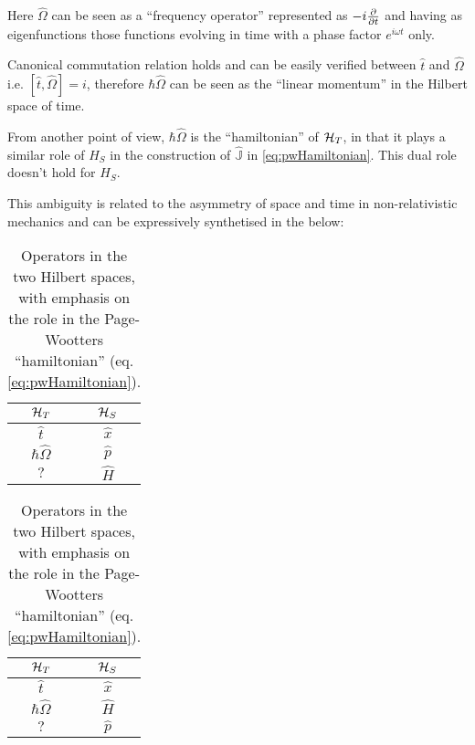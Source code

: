 Here $\hat{\Omega}$ can be seen as a ``frequency operator''
represented as $-i\pdv{t}$ and having as eigenfunctions
those functions evolving in time with a phase factor $e^{i \omega t}$ only.

Canonical commutation relation holds and can be easily verified
between $\hat{t}$ and $\hat{\Omega}$
i.e. $[\hat{t}, \hat{\Omega}] = i$,
therefore $\hbar\hat{\Omega}$ can be seen as the ``linear momentum''
in the Hilbert space of time.

From another point of view, $\hbar\hat{\Omega}$ is the ``hamiltonian'' of $\mathcal{H}_T$,
in that it plays a similar role of $H_S$ in the construction of
$\hat{\mathbb{J}}$ in \eqref{eq:pwHamiltonian}. This dual role doesn't hold
for $H_S$. 

This ambiguity is related to the asymmetry of space and time in non-relativistic
mechanics and can be expressively synthetised in the below:
{
  \begin{table}[h!]
    \parbox{.45\linewidth}{
      \centering
      \begin{tabular}{c|c}
        $\mathcal{H}_T$        & $\mathcal{H}_S$  \\
        \hline
        \hline
        $\hat{t}$           & $\hat{x}$     \\
        \hline
        $\hbar\hat{\Omega}$ & $\hat{p}$     \\
        \hline
        $?$                 & $\hat{H}$
      \end{tabular}
      {\caption{
        Operators in the two Hilbert spaces,
        with emphasis on the algebraic relation
        to other operators in the same space.
      }\label{op_comparison_alg}}
    }
    \hfill
    \parbox{.45\linewidth}{
      \centering
      \begin{tabular}{c|c}
        $\mathcal{H}_T$        & $\mathcal{H}_S$  \\
        \hline
        \hline
        $\hat{t}$           & $\hat{x}$     \\
        \hline
        $\hbar\hat{\Omega}$ & $\hat{H}$     \\
        \hline
        $?$                 & $\hat{p}$
      \end{tabular}
      {\caption{
        Operators in the two Hilbert spaces,
        with emphasis on the role in the
        Page-Wootters ``hamiltonian'' (eq. \ref{eq:pwHamiltonian}).
      }\label{op_comparison_J}}
    }
  \end{table}
}

